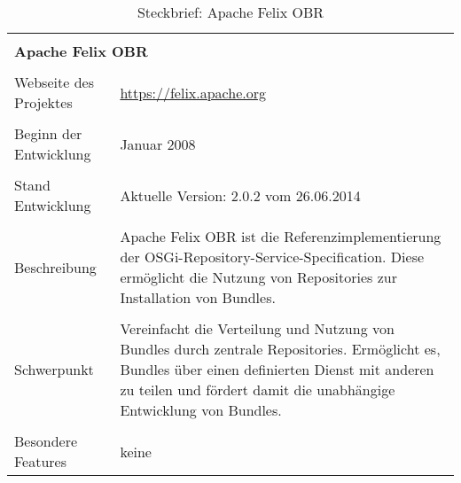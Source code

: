 \begin{table}[H]
 \centering
 \caption{Steckbrief: Apache Felix OBR}
 \begin{framed}
 \begin{tabular}{l|l|l|l}
  \multicolumn{4}{l}{}\\
  \multicolumn{4}{l}{\textbf{Apache Felix OBR}}\\
  \multicolumn{4}{l}{}\\
  \toprule
  \multicolumn{2}{l|}{Webseite des Projektes} & \multicolumn{2}{p{8cm}}{\url{https://felix.apache.org}}\\
  
  \multicolumn{2}{l|}{} & \multicolumn{2}{l}{}\\
  
  \multicolumn{2}{l|}{Beginn der Entwicklung} & \multicolumn{2}{p{8cm}}{Januar 2008\footnotemark}\\
  
  \multicolumn{2}{l|}{} & \multicolumn{2}{l}{}\\
  
  \multicolumn{2}{l|}{Stand Entwicklung} & \multicolumn{2}{p{8cm}}{Aktuelle Version: 2.0.2 vom 26.06.2014} \\
  
  \multicolumn{2}{l|}{} & \multicolumn{2}{l}{} \\
  
  \multicolumn{2}{l|}{Beschreibung} &  \multicolumn{2}{p{8cm}}{
  Apache Felix OBR ist die Referenzimplementierung der OSGi-Repository-Service-Specification. Diese ermöglicht die Nutzung von Repositories zur Installation von Bundles.
  } \\
  
  \multicolumn{2}{l|}{} & \multicolumn{2}{l}{} \\
  
  \multicolumn{2}{l|}{Schwerpunkt} &  \multicolumn{2}{p{8cm}}{
  Vereinfacht die Verteilung und Nutzung von Bundles durch zentrale Repositories. 
  Ermöglicht es, Bundles über einen definierten Dienst mit anderen zu teilen und fördert damit die unabhängige Entwicklung von Bundles.
  } \\
  
  \multicolumn{2}{l|}{} & \multicolumn{2}{l}{} \\
  
  \multicolumn{2}{l|}{Besondere Features} & \multicolumn{2}{p{8cm}}{keine} \\
  

\end{tabular}
\end{framed}
\end{table}
